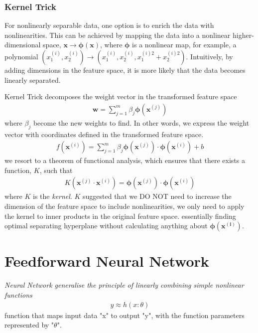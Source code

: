 \documentclass[a4paper,10pt]{article}
\begin{document}
\subsubsection{Kernel Trick}
For nonlinearly separable data, one option is to enrich the data with nonlinearities. This can be achieved by mapping the data into a nonlinear higher-dimensional space, $\mathbf{x}\rightarrow\mathbf{\phi(x)}$, where $\mathbf{\phi}$ is a nonlinear map, for example, a polynomial $(x_1^{(i)},x_2^{(i)})\rightarrow(x_1^{(i)},x_2^{(i)},x_1^{(i)2}+x_2^{(i)2})$. Intuitively, by adding dimensions in the feature space, it is more likely that the data becomes linearly separated.\par 

Kernel Trick decomposes the weight vector in the transformed feature space
\begin{gather*}
    \mathbf{w} = \sum_{j=1}^{m}\beta_j\pmb{\phi}(\pmb{x}^{(j)})
\end{gather*}
where $\beta_j$ become the new weights to find. In other words, we express the weight vector with coordinates defined in the transformed feature space.
\begin{gather*}
    f(\pmb{x}^{(i)}) = \sum_{j=1}^{m}\beta_j\pmb{\phi}(\pmb{x}^{(j)})\cdot\pmb{\phi}(\pmb{x}^{(i)})+b 
\end{gather*}
we resort to a theorem of functional analysis, which ensures that there exists a function, $K$, such that
\begin{gather*}
    K(\pmb{x}^{(j)}\cdot\pmb{x}^{(i)}) = \pmb{\phi}(\pmb{x}^{(j)})\cdot\pmb{\phi}(\pmb{x}^(i))
\end{gather*}
where $K$ is the \textit{kernel}. $K$ suggested that we DO NOT need to increase the dimension of the feature space to include nonlinearities, we only need to apply the kernel to inner products in the original feature space. essentially finding optimal separating hyperplane without calculating anything about $\pmb{\phi(x^{(i)})}$.





\section{Feedforward Neural Network}
\textit{Neural Network generalise the principle of linearly combining simple nonlinear functions}
\begin{gather*}
    y\approx h(x:\theta)
\end{gather*}
function that maps input data "x" to output "y", with the function parameters represented by "$\theta$".
\end{document}
